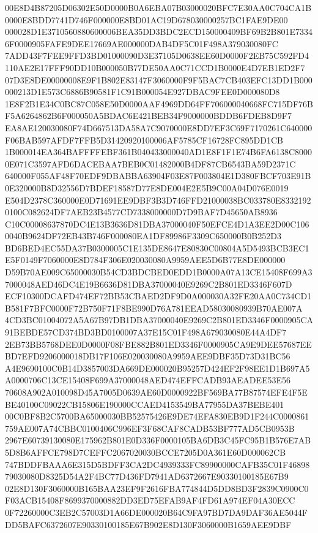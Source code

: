 \documentclass[UTF8,fontset=fandol,zihao=-4,a4paper]{ctexart}
\begin{document}
{{00E8D4B87205D06302E50D0000B0A6EBA07B03000020BFC7E30AA0C704CA1B0000E8BDD7741D746F000000E8BD01AC19D678030000257BC1FAE9DE00
000028D1E3710560880600006BEA35DD3BDC2ECD150000409BF69B2B801E73346F0000905FAFE9DEE17669AE000000DAB4DF5C01F498A379030080FC
7ADD43F7FEE9FFD3BD01000090D3E37105D0638EE60D0000F2EB75C592FD4110AE2E17FFF90DD10B000050B77DE50AA0C71CCD1B0000E4D7EB1ED2F7
07D3E8DE00000008E9F1B802E83147F3060000F9F5BAC7CB403EFC13DD1B000000213D1E573C6886B90581F1C91B000054E927DBAC9FEE0D000080D8
1E8F2B1E34C0BC87C058E50D0000AAF4969DD64FF706000040668FC715DF76BF5A6264862B6F000050A5BDAC6E421BEB34F9000000BDDB6FDEB8D9F7
EA8AE120030080F74D667513DA58A7C9070000E8DD7EF3C69F7170261C640000F06BAB597AFDF7FFB5D31420920100006AF5785CF16728FC895DD1CB
1B000014EA364BAFFFFEBF361B040433000040AD1E8F1F1E74B6FA6138C80000E071C3597AFD6DACEBAA7BEB0C01482000B4DF87CB6543BA59D2371C
640000F055AF48F70EDF9DBABBA63904F03E87F003804E1D380FBCF703E91B0E320000B8D32556D7BDEF18587D77E8DE004E2E5B9C00A04D076E0019
E504D2378C360000E0D71691EE9DBF3B3D746FFD21000038BC033780E83321920100C082624DF7AEB23B4577CD7338000000D7D9BAF7D45650AB8936
C10C00008637870DC4E13B3636D81DBA37000040F50EFCE4D1A3EE2D00C1060040B9624DF72EB43B746F000080EA1DF89986F3309C650000B0B252D3
BD6BED4EC55DA37B0300005C1E135DE8647E80830C00804A5D5493BCB3EC1E5F0149F7060000E8D784F306E020030080A9959AEE5D6B77E8DE000000
D59B70AE009C65000030B54CD3BDCBED0EDD1B0000A07A13CE15408F699A37000048AED46DC4E19B6636D81DBA37000040E9269C2B801ED3346F607D
ECF10300DCAFD474EF72BB53CBAED2DF9D0A000030A32FE20AA0C734CD1B581F7BFC0000F72B750F71F8BE990D76A781EEAD58030080939B70AE007A
4CD3BC01004072A5A67B97DB1DBA37000040E9269C2B801ED3346F0000905CA91BEBDE57CD374BD3BD0100007A37E15C01F498A679030080E44A4DF7
2EB73BB5768DEE0D0000F08FBE882B801ED3346F0000905CA9E9DEE57687EEBD7EFD9206000018DB17F106E020030080A9959AEE9DBF35D73D31BC56
A4E9690100C0B14D3857003DA669DE000020B95257D424EF2F98EE1D1B697A5A0000706C13CE15408F699A37000048AED474EFFCADB93AEADEE53E56
70608A902A010098D45A7005D0639AE60D0000922BF569BA77B87574EFE4F5EBE40100C09022CB15806E190000CCAED4153549BA77955DA37BEBE401
00C0BF8B2C5700BA65000030BB52575426E9DE74EFA830EB9D1F244C0000861759AE007A74CBBC0100406C996EF3F68CAF8CADB53BF777AD5CB0953B
2967E60739130080E175962B801E0D336F0000105BA6DB3C45FC95B1B576E7AB5D8B6AFFCE798D7CEFFC2067020030BCCE7205D0A361E60D000062CB
747BDDFBAAA6E315D5BDFF3CA2DC4939333FC89900000CAFB35C01F4689879030080D8325D54A2F4BC77D436FD7941AD6372667E90330100185E67B9
02E8D130F3060000B165BAA23EF9F2616FBA774844D5DD8BD3F2839C0900C0F03ACB15408F8699370000882DD3ED75EFAB9AF4FD61A974EF04A30ECC
0F72260000C3EB2C57003D1A66DE000020B64C9FA97BD7DA9DAF36AE5044FDD5BAFC6372607E90330100185E67B902E8D130F3060000B1659AEE9DBF
}}
\end{document}
